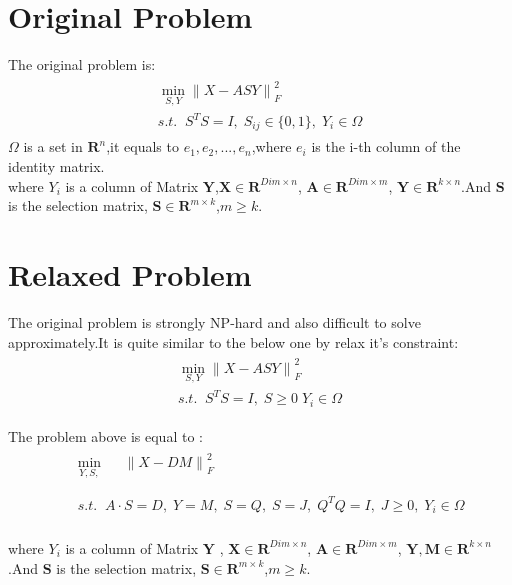 \documentclass{article}
\begin{document}
\section{Original Problem}
  The original problem is\;:
\begin{eqnarray}
\begin{array}{l}
    \mathop{\min}\limits_{S, Y} {\parallel X - ASY\parallel}_F^2 \\
    s.t. \;\; S^TS = I, \; S_{ij} \in \{0,1\}, \; Y_i \in \Omega
\end{array}
\end{eqnarray}
$\Omega$ is a set in $\mathbf{R}^{n}$,it equals to ${e_1,e_2,...,e_n}$,where $e_i$ is the i-th column of the identity matrix.\\
where $Y_i$ is a column of Matrix $\mathbf{Y}$,$\mathbf{X} \in \mathbf{R}^{Dim\times n}$, $\mathbf{A} \in \mathbf{R}^{Dim \times m}$, $\mathbf{Y} \in \mathbf{R}^{k\times n}$.And $\mathbf{S}$ is the selection matrix, $\mathbf{S} \in \mathbf{R}^{m\times k}$,$m \geq k$.

\section{Relaxed Problem}
  The original problem is strongly NP-hard and also difficult to solve approximately.It is quite similar to the below one by relax it's constraint\;:
\begin{eqnarray}
\begin{array}{l}
    \mathop{\min}\limits_{S, Y} {\parallel X - ASY\parallel}_F^2 \\
    s.t. \;\; S^TS = I, \; S \geq 0 \; Y_i \in \Omega
\end{array}
\end{eqnarray}

The problem above is equal to \;:
\begin{eqnarray}
&& \begin{array}{lll}
\mathop{\min}\limits_{Y,S,} && {\parallel X - DM\parallel}_F^2
\end{array}\\ \nonumber \\
&& \begin{array}{lll}
s.t. \;\; A\cdot S =D  , \; Y = M , \; S = Q , \; S = J , \; Q^TQ = I , \; J \geq 0 , \; Y_i \in \Omega \nonumber
\end{array}
\end{eqnarray}\\
where $Y_i$ is a column of Matrix $\mathbf{Y}$ , $\mathbf{X} \in \mathbf{R}^{Dim\times n}$, $\mathbf{A} \in \mathbf{R}^{Dim \times m}$, $\mathbf{Y,M} \in \mathbf{R}^{k\times n}$.And $\mathbf{S}$ is the selection matrix, $\mathbf{S} \in \mathbf{R}^{m\times k}$,$m \geq k$.
\end{document}
